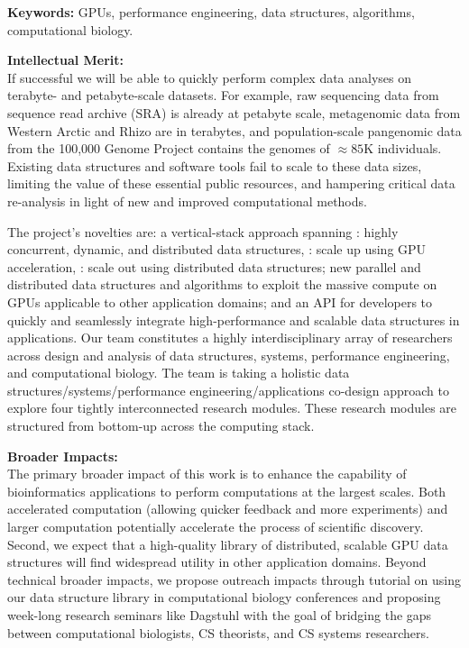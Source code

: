\noindent \textbf{\large Keywords:} GPUs, performance engineering, data structures, algorithms,   computational biology.

\noindent \textbf{\large Intellectual Merit:}\\
If successful we will be able to quickly perform complex data analyses on terabyte- and petabyte-scale datasets. For example, raw sequencing data from sequence read archive (SRA) is already at petabyte scale, metagenomic data from Western Arctic and Rhizo are in terabytes, and population-scale pangenomic data from the 100,000 Genome Project contains the genomes of $\approx85$K individuals. Existing data structures and software tools fail to scale to these data sizes, limiting the value of these essential public resources, and hampering critical data re-analysis in light of new and improved computational methods.

The project’s novelties are: a vertical-stack approach spanning : highly concurrent, dynamic, and distributed data structures,
: scale up using GPU acceleration, : scale out using distributed data structures; new parallel and
distributed data structures and algorithms to exploit the massive compute on
GPUs applicable to other application domains; and an API for developers to
quickly and seamlessly integrate high-performance and scalable data structures
in applications.
%
Our team constitutes a highly interdisciplinary array of researchers across design and analysis of data structures, systems, performance engineering, and computational biology. The team is taking a holistic data structures/systems/performance engineering/applications co-design approach to explore four tightly interconnected research modules. These research modules are structured from bottom-up across the computing stack.


\noindent \textbf{\large Broader Impacts: }\\
The primary broader impact of this work is to enhance the capability of
bioinformatics applications to perform computations at the largest scales. Both
accelerated computation (allowing quicker feedback and more experiments) and
larger computation potentially accelerate the process of scientific discovery.
Second, we expect that a high-quality library of distributed, scalable GPU data
structures will find widespread utility in other application domains.
%
Beyond technical broader impacts, we propose outreach impacts through tutorial
on using our data structure library in computational biology conferences and
proposing week-long research seminars like Dagstuhl with the goal of bridging
the gaps between computational biologists, CS theorists, and CS systems
researchers. 
